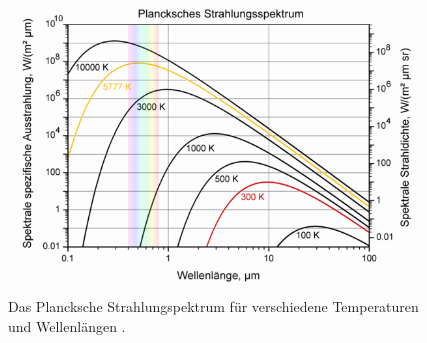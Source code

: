 \begin{figure}
  \centering
  \includegraphics[height=8cm]{images/BlackbodySpectrum.png}
  \caption{Das Plancksche Strahlungspektrum für verschiedene Temperaturen
  und Wellenlängen \cite{waermestrahlung}.}
  \label{fig:waermestrahlung}
\end{figure}
